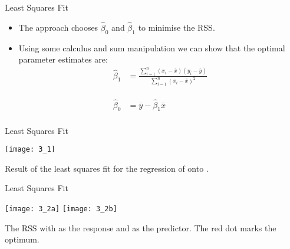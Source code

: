 \documentclass[mathserif, aspectratio=169]{beamer}
\begin{document}
\begin{frame}{Least Squares Fit}
	\begin{itemize}
		\item The  approach chooses $\hat{\beta}_0$ and $\hat{\beta}_1$
			to minimise the RSS.
		\item Using some calculus and sum manipulation we can show that the optimal\\
			parameter estimates are:
				\begin{align*}
					\hat{\beta}_1 &= \frac{\sum_{i=1}^n (x_i - \overline{x})(y_i - \overline{y})}
					{\sum_{i=1}^n (x_i - \overline{x})^2}\\
					\phantom{a} & \phantom{b} \\
					\hat{\beta}_0 &= \overline{y} - \hat{\beta}_1 \overline{x}\\
				\end{align*}
	\end{itemize}
\end{frame}

\begin{frame}{Least Squares Fit}
	\begin{center}
		\texttt{[image: 3\_1]}

		Result of the least squares fit for the regression of  onto .
	\end{center}
\end{frame}

\begin{frame}{Least Squares Fit}
	\begin{center}
		\texttt{[image: 3\_2a]}
		\texttt{[image: 3\_2b]}

		The RSS with  as the response and  as the predictor. The red dot marks the optimum.
	\end{center}
\end{frame}
\end{document}
